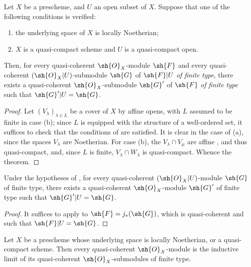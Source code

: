\begin{theorem}[9.4.7]
\label{I.9.4.7}
Let $X$ be a prescheme, and $U$ an open subset of $X$. Suppose that one of the following conditions is verified:
\begin{enumerate}
  \item[{\rm(a)}] the underlying space of $X$ is locally Noetherian;
  \item[{\rm(b)}] $X$ is a quasi-compact scheme and $U$ is a quasi-compact open.
\end{enumerate}
Then, for every quasi-coherent $\sh{O}_X$-module $\sh{F}$ and every quasi-coherent
$(\sh{O}_X|U)$-submodule $\sh{G}$ of $\sh{F}|U$ \emph{of finite type}, there exists a
quasi-coherent $\sh{O}_X$-submodule $\sh{G}'$ of $\sh{F}$ \emph{of finite type} such that
$\sh{G}'|U=\sh{G}$.
\end{theorem}

\begin{proof}
Let
$(V_\lambda)_{\lambda\in L}$ be a cover of $X$ by affine opens, with $L$ assumed to be finite
in case (b); since $L$ is equipped with the structure of a well-ordered set, it suffices to
check that the conditions of  are satisfied. It is clear in the case of (a),
    since the spaces $V_\lambda$ are Noetherian. For case (b), the $V_\lambda\cap V_\mu$ are
affine , and thus quasi-compact, and, since $L$ is finite,
$V_\lambda\cap W_\lambda$ is quasi-compact. Whence the theorem.
\end{proof}

\begin{corollary}[9.4.8]
\label{I.9.4.8}
Under the hypotheses of , for every quasi-coherent $(\sh{O}_X|U)$-module
$\sh{G}$ of finite type, there exists a quasi-coherent $\sh{O}_X$-module $\sh{G}'$ of finite
type such that $\sh{G}'|U=\sh{G}$.
\end{corollary}

\begin{proof}
It suffices to apply  to $\sh{F}=j_*(\sh{G})$, which is quasi-coherent
 and such that $\sh{F}|U=\sh{G}$.
\end{proof}

\begin{corollary}[9.4.9]
\label{I.9.4.9}
Let $X$ be a prescheme whose underlying space is locally Noetherian, or a quasi-compact
scheme. Then every quasi-coherent $\sh{O}_X$-module is the inductive limit of its quasi-coherent
$\sh{O}_X$-submodules of finite type.
\end{corollary}

